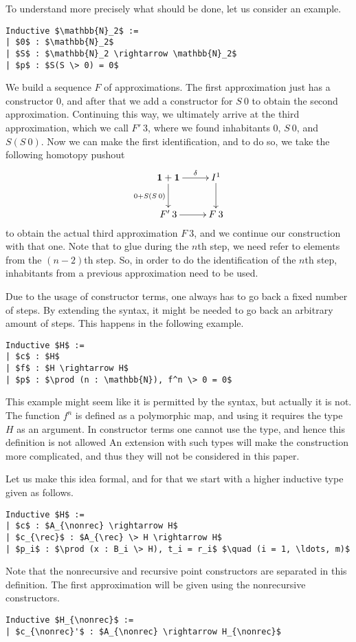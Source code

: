\documentclass[a4paper,UKenglish]{lipics-v2016}
\newcommand{\one}[0]{\textbf{1}}
\newcommand{\rec}[0]{\operatorname{rec}}
\newcommand{\nonrec}[0]{\operatorname{nonrec}}
\begin{document}
To understand more precisely what should be done, let us consider an example.
\lstset{language=Coq}
\begin{lstlisting}
Inductive $\mathbb{N}_2$ :=
| $0$ : $\mathbb{N}_2$
| $S$ : $\mathbb{N}_2 \rightarrow \mathbb{N}_2$
| $p$ : $S(S \> 0) = 0$
\end{lstlisting}
We build a sequence $F$ of approximations.
The first approximation just has a constructor $0$, and after that we add a constructor for $S \> 0$ to obtain the second approximation.
Continuing this way, we ultimately arrive at the third approximation, which we call $F' \> 3$, where we found inhabitants $0$, $S \> 0$, and $S(S \> 0)$.
Now we can make the first identification, and to do so, we take the following homotopy pushout
\[
\xymatrix
{
        \one + \one \ar[d]_{0 + S(S \> 0)} \ar[r]^-{\delta} & I^1 \ar[d]\\
        F' \> 3\ar[r] & F \> 3
}
\]
to obtain the actual third approximation $F \> 3$, and we continue our construction with that one.
Note that to glue during the $n$th step, we need refer to elements from the $(n-2)$th step.
So, in order to do the identification of the $n$th step, inhabitants from a previous approximation need to be used.

Due to the usage of constructor terms, one always has to go back a fixed number of steps.
By extending the syntax, it might be needed to go back an arbitrary amount of steps.
This happens in the following example.
\lstset{language=Coq}
\begin{lstlisting}
Inductive $H$ :=
| $c$ : $H$
| $f$ : $H \rightarrow H$
| $p$ : $\prod (n : \mathbb{N}), f^n \> 0 = 0$
\end{lstlisting}
This example might seem like it is permitted by the syntax, but actually it is not.
The function $f^n$ is defined as a polymorphic map, and using it requires the type $H$ as an argument.
In constructor terms one cannot use the type, and hence this definition is not allowed
An extension with such types will make the construction more complicated, and thus they will not be considered in this paper.

Let us make this idea formal, and for that we start with a higher inductive type given as follows.
\lstset{language=Coq}
\begin{lstlisting}[label={lst:HIT}]
Inductive $H$ :=
| $c$ : $A_{\nonrec} \rightarrow H$
| $c_{\rec}$ : $A_{\rec} \> H \rightarrow H$
| $p_i$ : $\prod (x : B_i \> H), t_i = r_i$ $\quad (i = 1, \ldots, m)$
\end{lstlisting}
Note that the nonrecursive and recursive point constructors are separated in this definition.
The first approximation will be given using the nonrecursive constructors.
\lstset{language=Coq}
\begin{lstlisting}
Inductive $H_{\nonrec}$ :=
| $c_{\nonrec}'$ : $A_{\nonrec} \rightarrow H_{\nonrec}$
\end{lstlisting}
\end{document}
